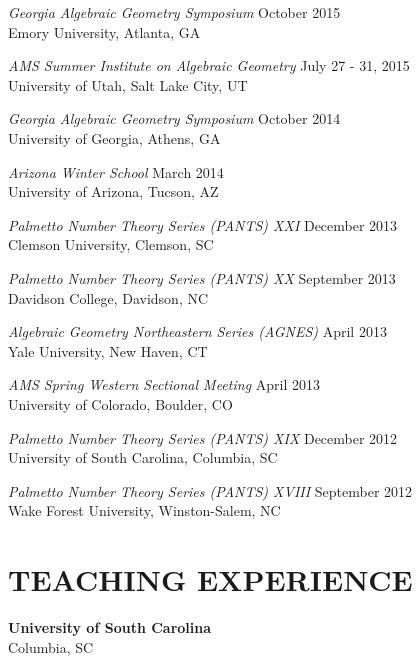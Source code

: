 \documentclass[line,overlapped]{res}
\begin{document}
\begin{resume}
         {\sl Georgia Algebraic Geometry Symposium} \hfill October 2015\\
         Emory University, Atlanta, GA

         {\sl AMS Summer Institute on Algebraic Geometry} \hfill July 27 - 31, 2015\\
         University of Utah, Salt Lake City, UT

         {\sl Georgia Algebraic Geometry Symposium} \hfill October 2014\\
         University of Georgia, Athens, GA

         {\sl Arizona Winter School} \hfill March 2014\\
         University of Arizona, Tucson, AZ

         {\sl Palmetto Number Theory Series (PANTS) XXI} \hfill December 2013\\
         Clemson University, Clemson, SC

         {\sl Palmetto Number Theory Series (PANTS) XX} \hfill September 2013\\
         Davidson College, Davidson, NC

         {\sl Algebraic Geometry Northeastern Series (AGNES)} \hfill April 2013\\
         Yale University, New Haven, CT

         {\sl AMS Spring Western Sectional Meeting} \hfill April 2013\\
         University of Colorado, Boulder, CO

         {\sl Palmetto Number Theory Series (PANTS) XIX} \hfill December 2012\\
         University of South Carolina, Columbia, SC

         {\sl Palmetto Number Theory Series (PANTS) XVIII} \hfill September 2012\\
         Wake Forest University, Winston-Salem, NC

\newpage

 \section{TEACHING EXPERIENCE}
         {\bf University of South Carolina}\\Columbia, SC
         

\end{resume}
\end{document}
